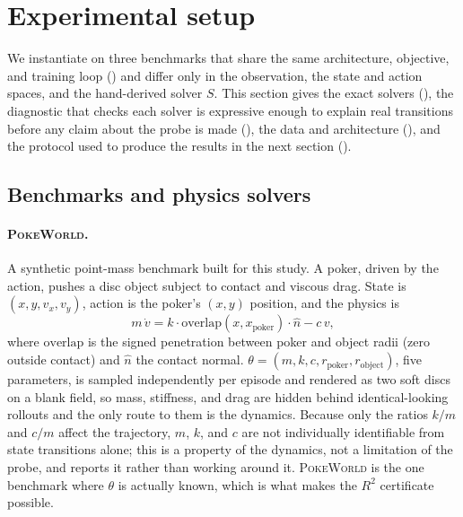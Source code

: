\section{Experimental setup}
\label{sec:experimental-setup}

We instantiate \method on three benchmarks that share the same
architecture, objective, and training loop () and
differ only in the observation, the state and action spaces, and the
hand-derived solver $S$. This section gives the exact solvers
(), the diagnostic that checks each solver
is expressive enough to explain real transitions before any claim
about the probe is made (), the data and
architecture (), and the protocol used to produce
the results in the next section ().

\subsection{Benchmarks and physics solvers}
\label{sec:setup-benchmarks}

\paragraph{\textsc{PokeWorld}.} A synthetic point-mass benchmark built
for this study. A poker, driven by the action, pushes a disc object
subject to contact and viscous drag. State is $(x, y, v_x, v_y)$,
action is the poker's $(x, y)$ position, and the physics is
\begin{equation}
  m \, \dot v = k \cdot \mathrm{overlap}(x, x_{\mathrm{poker}}) \cdot
    \hat n - c\, v,
\end{equation}
where $\mathrm{overlap}$ is the signed penetration between poker and
object radii (zero outside contact) and $\hat n$ the contact normal.
$\theta = (m, k, c, r_{\mathrm{poker}}, r_{\mathrm{object}})$, five
parameters, is sampled independently per episode and rendered as two
soft discs on a blank field, so mass, stiffness, and drag are hidden
behind identical-looking rollouts and the only route to them is the
dynamics. Because only the ratios $k/m$ and $c/m$ affect the
trajectory, $m$, $k$, and $c$ are not individually identifiable from
state transitions alone; this is a property of the dynamics, not a
limitation of the probe, and  reports it
rather than working around it. \textsc{PokeWorld} is the one benchmark
where $\theta$ is actually known, which is what makes the $R^2$
certificate possible.


